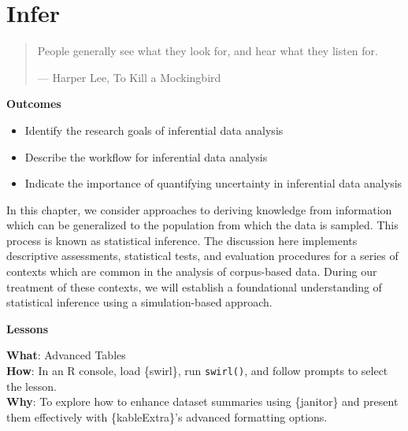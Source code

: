 \documentclass[
  letterpaper,
]{latex/krantz}
\providecommand{\tightlist}{%
  \setlength{\itemsep}{0pt}\setlength{\parskip}{0pt}}\usepackage{longtable,booktabs,array}
\theoremstyle{definition}
\theoremstyle{remark}
\begin{document}
\chapter{Infer}\label{sec-infer-chapter}

\begin{quote}
People generally see what they look for, and hear what they listen for.

--- Harper Lee, To Kill a Mockingbird
\end{quote}

\begin{tcolorbox}[enhanced jigsaw, bottomrule=.15mm, leftrule=.75mm, toprule=.15mm, breakable, colframe=quarto-callout-color-frame, arc=.35mm, left=2mm, rightrule=.15mm, opacityback=0, colback=white]

\textbf{ Outcomes}

\begin{itemize}
\tightlist
\item
  Identify the research goals of inferential data analysis
\item
  Describe the workflow for inferential data analysis
\item
  Indicate the importance of quantifying uncertainty in inferential data
  analysis
\end{itemize}

\end{tcolorbox}

In this chapter, we consider approaches to deriving knowledge from
information which can be generalized to the population from which the
data is sampled. This process is known as statistical inference. The
discussion here implements descriptive assessments, statistical tests,
and evaluation procedures for a series of contexts which are common in
the analysis of corpus-based data. During our treatment of these
contexts, we will establish a foundational understanding of statistical
inference using a simulation-based approach.

\begin{tcolorbox}[enhanced jigsaw, bottomrule=.15mm, leftrule=.75mm, toprule=.15mm, breakable, colframe=quarto-callout-color-frame, arc=.35mm, left=2mm, rightrule=.15mm, opacityback=0, colback=white]

\textbf{ Lessons}

\textbf{What}: Advanced Tables\\
\textbf{How}: In an R console, load \{swirl\}, run \texttt{swirl()}, and
follow prompts to select the lesson.\\
\textbf{Why}: To explore how to enhance dataset summaries using
\{janitor\} and present them effectively with \{kableExtra\}'s advanced
formatting options.

\end{tcolorbox}
\end{document}
